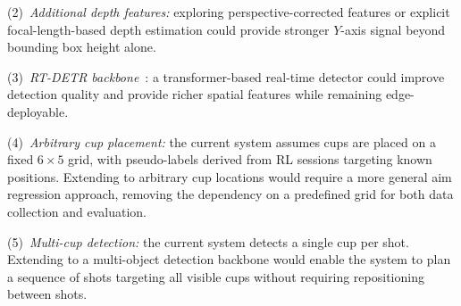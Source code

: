 \documentclass[conference]{IEEEtran}
\begin{document}
(2)~\textit{Additional depth features:} exploring perspective-corrected
features or explicit focal-length-based depth estimation could provide stronger
$Y$-axis signal beyond bounding box height alone.

(3)~\textit{RT-DETR backbone}~\cite{zhao2024}: a transformer-based real-time
detector could improve detection quality and provide richer spatial features
while remaining edge-deployable.

(4)~\textit{Arbitrary cup placement:} the current system assumes cups are
placed on a fixed $6{\times}5$ grid, with pseudo-labels derived from RL
sessions targeting known positions.  Extending to arbitrary cup locations would
require a more general aim regression approach, removing the dependency on a
predefined grid for both data collection and evaluation.

(5)~\textit{Multi-cup detection:} the current system detects a single cup per
shot.  Extending to a multi-object detection backbone would enable the system
to plan a sequence of shots targeting all visible cups without requiring
repositioning between shots.


\end{document}
